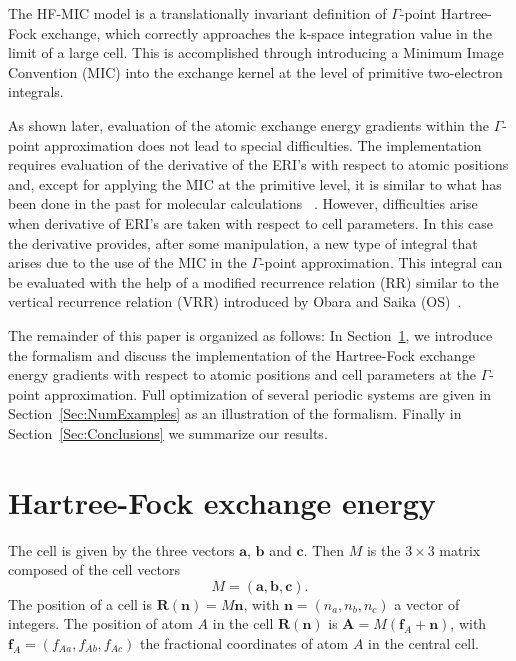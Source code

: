 \documentclass[prl,preprint,doublespace]{revtex4} %
\begin{document}
The HF-MIC model is a translationally invariant definition of $\Gamma$-point Hartree-Fock exchange, 
which correctly approaches the k-space integration value in the limit of a
large cell. This is accomplished through introducing a 
Minimum Image Convention (MIC) into the exchange kernel
at the level of primitive two-electron integrals.

As shown later, evaluation of the atomic exchange energy gradients
within the $\Gamma$-point approximation
does not lead to special difficulties. The implementation requires evaluation
of the derivative of the ERI's with respect to atomic positions and, 
except for applying the MIC at the primitive level, it is
similar to what has been done in the past for molecular calculations
~\cite{SObara86,MGordon88,KIshida91,THelgaker92,KIshida93}.
However, difficulties arise when derivative of ERI's are taken with respect to cell 
parameters. In this case the derivative provides, after some manipulation, 
a new type of integral that
arises due to the use of the MIC in the $\Gamma$-point approximation. This integral 
can be evaluated with the help of a modified recurrence relation (RR) similar to the
vertical recurrence relation (VRR) introduced by Obara and Saika (OS)~\cite{SObara86}.

The remainder of this paper is organized as follows:
In Section~\ref{Sec:Formalism}, we introduce the formalism and discuss
the implementation of the Hartree-Fock exchange energy gradients with respect 
to atomic positions and cell parameters
at the $\Gamma$-point approximation. Full optimization of several periodic systems are given
in Section~\ref{Sec:NumExamples} as an illustration of the formalism.
Finally in Section~\ref{Sec:Conclusions} we summarize our results.


\section{Hartree-Fock exchange energy}\label{Sec:Formalism}
The cell is given by the three vectors $\mathbf{a}$, 
$\mathbf{b}$ and $\mathbf{c}$. Then $M$ is the $3\times3$ matrix composed 
of the cell vectors
\begin{equation*}
  M=(\mathbf{a},\mathbf{b},\mathbf{c}).
\end{equation*}
The position of a cell is $\mathbf{R(n)}=M\mathbf{n}$,
with $\mathbf{n}=(n_a,n_b,n_c)$ a vector of integers.
The position of atom $A$ in the cell $\mathbf{R(n)}$ is $\mathbf{A}=M(\mathbf{f}_A+\mathbf{n})$,
with $\mathbf{f}_A=(f_{Aa},f_{Ab},f_{Ac})$ the fractional coordinates of 
atom $A$ in the central cell. 
\end{document}
